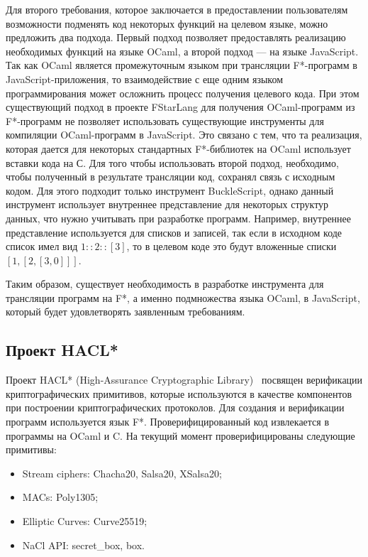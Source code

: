 Для второго требования, которое заключается в предоставлении пользователям возможности подменять код некоторых функций на целевом языке, можно предложить два подхода. Первый подход позволяет предоставлять реализацию необходимых функций на языке OCaml, а второй подход --- на языке JavaScript. Так как OCaml является промежуточным языком при трансляции F*-программ в JavaScript-приложения, то взаимодействие с еще одним языком программирования может осложнить процесс получения целевого кода. При этом существующий подход в проекте FStarLang для получения OCaml-программ из F*-программ не позволяет использовать существующие инструменты для компиляции OCaml-программ в JavaScript. Это связано с тем, что та реализация, которая дается для некоторых стандартных F*-библиотек на OCaml использует вставки кода на С. Для того чтобы использовать второй подход, необходимо, чтобы полученный в результате трансляции код, сохранял связь с исходным кодом. Для этого подходит только инструмент BuckleScript, однако данный инструмент использует внутреннее представление для некоторых структур данных, что нужно учитывать при разработке программ. Например, внутреннее представление используется для списков и записей, так если в исходном коде список имел вид $1::2::[3]$, то в целевом коде это будут вложенные списки $[ 1, [ 2, [ 3, 0 ] ] ]$. 

Таким образом, существует необходимость в разработке инструмента для трансляции программ на F*, а именно подмножества языка OCaml, в JavaScript, который будет удовлетворять заявленным требованиям.

\subsection{Проект HACL*}

Проект HACL* (High-Assurance Cryptographic Library)~\cite{hacl_star} посвящен верификации криптографических примитивов, которые используются в качестве компонентов при построении криптографических протоколов. Для создания и верификации программ используется язык F*. Проверифицированный код извлекается в программы на OCaml и C. На текущий момент проверифицированы следующие примитивы: 

\begin{itemize}
    \item Stream ciphers: Chacha20, Salsa20, XSalsa20;
    \item MACs: Poly1305;
    \item Elliptic Curves: Curve25519;
    \item NaCl API: secret\_box, box.
\end{itemize}

